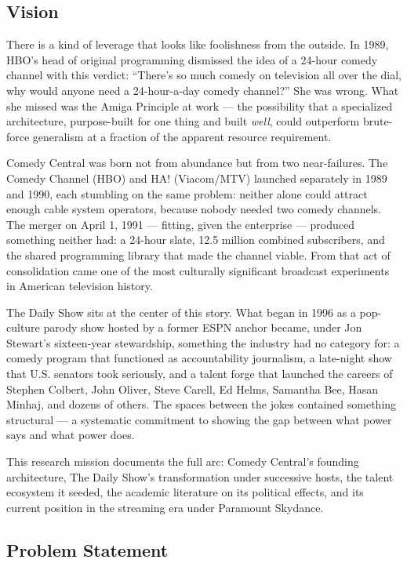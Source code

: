 \documentclass[11pt,letterpaper]{article}
\begin{document}
\subsection{Vision}

There is a kind of leverage that looks like foolishness from the outside. In 1989, HBO's head of original programming dismissed the idea of a 24-hour comedy channel with this verdict: ``There's so much comedy on television all over the dial, why would anyone need a 24-hour-a-day comedy channel?'' She was wrong. What she missed was the Amiga Principle at work --- the possibility that a specialized architecture, purpose-built for one thing and built \emph{well}, could outperform brute-force generalism at a fraction of the apparent resource requirement.

Comedy Central was born not from abundance but from two near-failures. The Comedy Channel (HBO) and HA! (Viacom/MTV) launched separately in 1989 and 1990, each stumbling on the same problem: neither alone could attract enough cable system operators, because nobody needed two comedy channels. The merger on April 1, 1991 --- fitting, given the enterprise --- produced something neither had: a 24-hour slate, 12.5 million combined subscribers, and the shared programming library that made the channel viable. From that act of consolidation came one of the most culturally significant broadcast experiments in American television history.

The Daily Show sits at the center of this story. What began in 1996 as a pop-culture parody show hosted by a former ESPN anchor became, under Jon Stewart's sixteen-year stewardship, something the industry had no category for: a comedy program that functioned as accountability journalism, a late-night show that U.S. senators took seriously, and a talent forge that launched the careers of Stephen Colbert, John Oliver, Steve Carell, Ed Helms, Samantha Bee, Hasan Minhaj, and dozens of others. The spaces between the jokes contained something structural --- a systematic commitment to showing the gap between what power says and what power does.

This research mission documents the full arc: Comedy Central's founding architecture, The Daily Show's transformation under successive hosts, the talent ecosystem it seeded, the academic literature on its political effects, and its current position in the streaming era under Paramount Skydance.

\subsection{Problem Statement}
\end{document}
